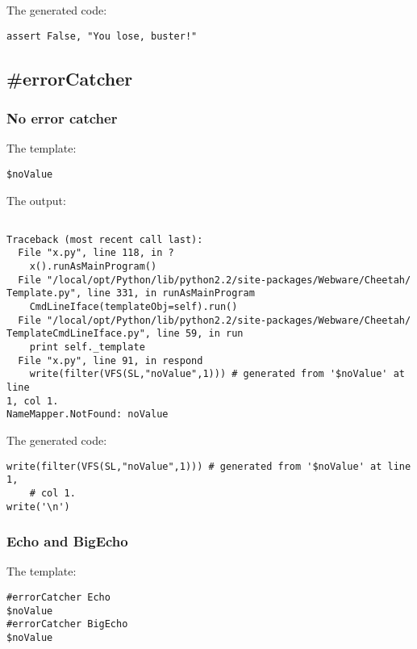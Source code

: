 The generated code:
\begin{verbatim}
assert False, "You lose, buster!"
\end{verbatim}

\subsection{\#errorCatcher}
\label{errorHandling.errorCatcher}

\subsubsection{No error catcher}
\label{errorHandling.errorCatcher.no}

The template:
\begin{verbatim}
$noValue
\end{verbatim}

The output:
\begin{verbatim}

Traceback (most recent call last):
  File "x.py", line 118, in ?
    x().runAsMainProgram()
  File "/local/opt/Python/lib/python2.2/site-packages/Webware/Cheetah/
Template.py", line 331, in runAsMainProgram
    CmdLineIface(templateObj=self).run()
  File "/local/opt/Python/lib/python2.2/site-packages/Webware/Cheetah/
TemplateCmdLineIface.py", line 59, in run
    print self._template
  File "x.py", line 91, in respond
    write(filter(VFS(SL,"noValue",1))) # generated from '$noValue' at line 
1, col 1.
NameMapper.NotFound: noValue
\end{verbatim}

The generated code:
\begin{verbatim}
write(filter(VFS(SL,"noValue",1))) # generated from '$noValue' at line 1, 
    # col 1.
write('\n')
\end{verbatim}

\subsubsection{Echo and BigEcho}
\label{errorHandling.errorCatcher.echo}

The template:
\begin{verbatim}
#errorCatcher Echo
$noValue
#errorCatcher BigEcho
$noValue
\end{verbatim}

